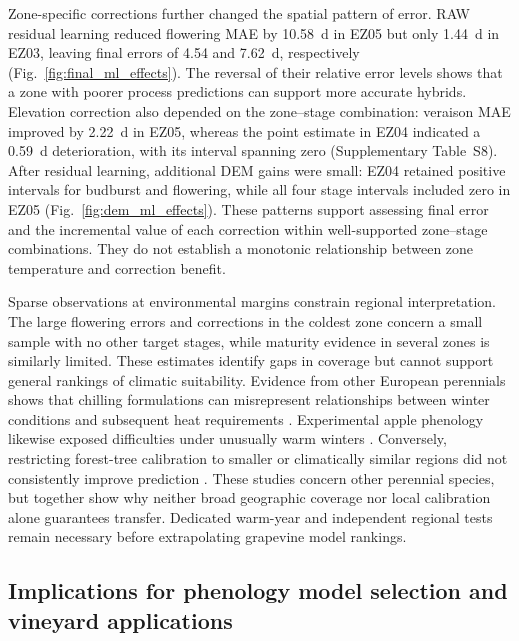 \documentclass[a4paper,12pt]{article}
\let\OriginalSubsection\subsection
\renewcommand{\subsection}{\FloatBarrier\OriginalSubsection}
\begin{document}
Zone-specific corrections further changed the spatial pattern of error. RAW residual learning reduced flowering MAE by 10.58~d in EZ05 but only 1.44~d in EZ03, leaving final errors of 4.54 and 7.62~d, respectively (Fig.~\ref{fig:final_ml_effects}). The reversal of their relative error levels shows that a zone with poorer process predictions can support more accurate hybrids. Elevation correction also depended on the zone--stage combination: veraison MAE improved by 2.22~d in EZ05, whereas the point estimate in EZ04 indicated a 0.59~d deterioration, with its interval spanning zero (Supplementary Table~S8). After residual learning, additional DEM gains were small: EZ04 retained positive intervals for budburst and flowering, while all four stage intervals included zero in EZ05 (Fig.~\ref{fig:dem_ml_effects}). These patterns support assessing final error and the incremental value of each correction within well-supported zone--stage combinations. They do not establish a monotonic relationship between zone temperature and correction benefit.

Sparse observations at environmental margins constrain regional interpretation. The large flowering errors and corrections in the coldest zone concern a small sample with no other target stages, while maturity evidence in several zones is similarly limited. These estimates identify gaps in coverage but cannot support general rankings of climatic suitability. Evidence from other European perennials shows that chilling formulations can misrepresent relationships between winter conditions and subsequent heat requirements \citep{wangOverestimationEffectClimatic2020}. Experimental apple phenology likewise exposed difficulties under unusually warm winters \citep{fernandezUnusuallyWarmWinter2022}. Conversely, restricting forest-tree calibration to smaller or climatically similar regions did not consistently improve prediction \citep{picornellInfluenceCalibrationData2025}. These studies concern other perennial species, but together show why neither broad geographic coverage nor local calibration alone guarantees transfer. Dedicated warm-year and independent regional tests remain necessary before extrapolating grapevine model rankings.

\subsection{Implications for phenology model selection and vineyard applications}
\end{document}
